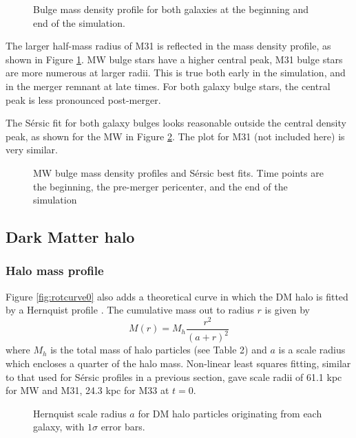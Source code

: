 \documentclass[twocolumn]{aastex63}
\begin{document}
\begin{figure}[bht!]
	\caption{Bulge mass density profile for both galaxies at the beginning and end of the simulation.
		\label{fig:bulge_mp}}
\end{figure}

The larger half-mass radius of M31 is reflected in the mass density profile, as shown in Figure \ref{fig:bulge_mp}. MW bulge stars have a higher central peak, M31 bulge stars are more numerous at larger radii. This is true both early in the simulation, and in the merger remnant at late times. For both galaxy bulge stars, the central peak is less pronounced post-merger.

The Sérsic fit for both galaxy bulges looks reasonable outside the central density peak, as shown for the MW in Figure \ref{fig:MW_bulge_sersic}. The plot for M31 (not included here) is very  similar.

\begin{figure}[bht!]
	\caption{MW bulge mass density profiles and Sérsic best fits. Time points are the beginning, the pre-merger pericenter, and the end of the simulation
		\label{fig:MW_bulge_sersic}}
\end{figure}

\subsection{Dark Matter halo}

\subsubsection{Halo mass profile}

Figure \ref{fig:rotcurve0} also adds a theoretical curve in which the DM halo is fitted by a Hernquist profile \citep{hernquist_analytical_1990}. The cumulative mass out to radius $r$ is given by
\[ M(r) = M_h \frac{r^2}{(a+r)^2} \]
where $M_h$ is the total mass of halo particles (see Table 2) and $a$ is a scale radius which encloses a quarter of the halo mass. Non-linear least squares fitting, similar to that used for Sérsic profiles in a previous section, gave scale radii of 61.1 kpc for MW and M31, 24.3 kpc for M33 at $t=0$.

\begin{figure}[htb!]
	\caption{Hernquist scale radius $a$ for DM halo particles originating from each galaxy, with $1\sigma$ error bars.
		\label{fig:hernquist_a}}
\end{figure}
\end{document}
